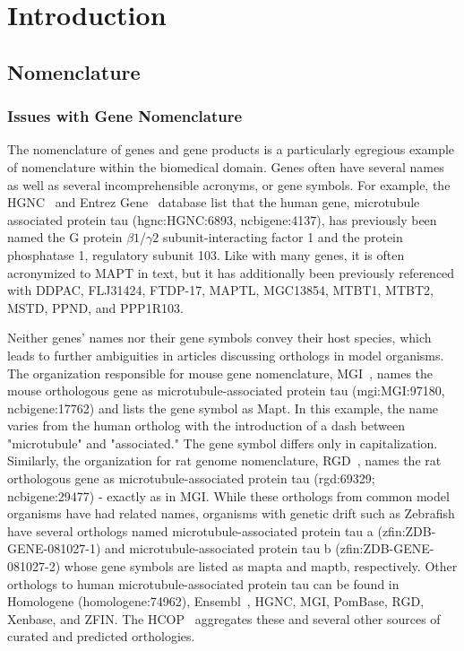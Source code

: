 \chapter{Introduction}
\label{ch:introduction}

\section{Nomenclature}

\subsection{Issues with Gene Nomenclature}

The nomenclature of genes and gene products is a particularly egregious example of nomenclature within the biomedical domain.
Genes often have several names as well as several incomprehensible acronyms, or gene symbols.
For example, the \ac{HGNC}~\cite{Yates2017} and Entrez Gene~\cite{Maglott2011} database list that the human gene, microtubule associated protein tau (hgnc:HGNC:6893, ncbigene:4137), has previously been named the G protein
$\beta1$/$\gamma2$ subunit-interacting factor 1 and the protein phosphatase 1,
regulatory subunit 103.
Like with many genes, it is often acronymized to MAPT in text, but it has additionally been previously referenced with DDPAC, FLJ31424, FTDP-17, MAPTL, MGC13854, MTBT1, MTBT2, MSTD, PPND, and PPP1R103.

Neither genes' names nor their gene symbols convey their host species, which leads to further ambiguities in articles discussing orthologs in model organisms.
The organization responsible for mouse gene nomenclature, \ac{MGI}~\cite{Blake2017}, names the mouse orthologous gene as microtubule-associated protein tau (mgi:MGI:97180, ncbigene:17762) and lists the gene symbol as Mapt.
In this example, the name varies from the human ortholog with the introduction of a dash between "microtubule" and "associated."
The gene symbol differs only in capitalization.
Similarly, the organization for rat genome nomenclature, \ac{RGD}~\cite{Shimoyama2015}, names the rat orthologous gene as microtubule-associated protein tau (rgd:69329; ncbigene:29477) - exactly as in \ac{MGI}.
While these orthologs from common model organisms have had related names, organisms with genetic drift such as Zebrafish have several orthologs named microtubule-associated protein tau a (zfin:ZDB-GENE-081027-1) and microtubule-associated protein tau b (zfin:ZDB-GENE-081027-2) whose gene symbols are listed as mapta and maptb, respectively.
Other orthologs to human microtubule-associated protein tau can be found in Homologene (homologene:74962), Ensembl~\cite{Zerbino2018}, \ac{HGNC}, \ac{MGI}, PomBase, \ac{RGD}, Xenbase, and \ac{ZFIN}.
The \ac{HCOP}~\cite{Wright2005} aggregates these and several other sources of curated and predicted orthologies.

